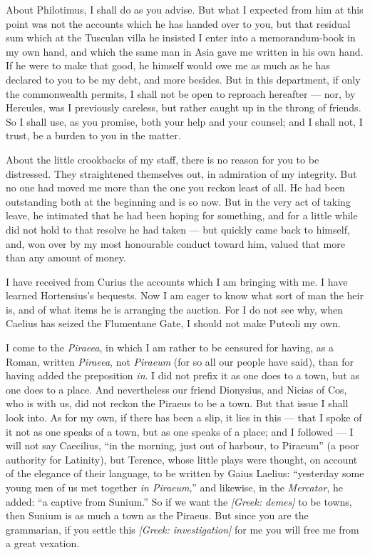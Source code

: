  About Philotimus, I shall do as you advise. But what I expected from him at this point was not the accounts which he has handed over to you, but that residual sum which at the Tusculan villa he insisted I enter into a memorandum-book in my own hand, and which the same man in Asia gave me written in his own hand. If he were to make that good, he himself would owe me as much as he has declared to you to be my debt, and more besides. But in this department, if only the commonwealth permits, I shall not be open to reproach hereafter --- nor, by Hercules, was I previously careless, but rather caught up in the throng of friends. So I shall use, as you promise, both your help and your counsel; and I shall not, I trust, be a burden to you in the matter.

 About the little crookbacks of my staff, there is no reason for you to be distressed. They straightened themselves out, in admiration of my integrity. But no one had moved me more than the one you reckon least of all. He had been outstanding both at the beginning and is so now. But in the very act of taking leave, he intimated that he had been hoping for something, and for a little while did not hold to that resolve he had taken --- but quickly came back to himself, and, won over by my most honourable conduct toward him, valued that more than any amount of money.

 I have received from Curius the accounts which I am bringing with me. I have learned Hortensius's bequests. Now I am eager to know what sort of man the heir is, and of what items he is arranging the auction. For I do not see why, when Caelius has seized the Flumentane Gate, I should not make Puteoli my own.

 I come to the \emph{Piraeea}, in which I am rather to be censured for having, as a Roman, written \emph{Piraeea}, not \emph{Piraeum} (for so all our people have said), than for having added the preposition \emph{in}. I did not prefix it as one does to a town, but as one does to a place. And nevertheless our friend Dionysius, and Nicias of Cos, who is with us, did not reckon the Piraeus to be a town. But that issue I shall look into. As for my own, if there has been a slip, it lies in this --- that I spoke of it not as one speaks of a town, but as one speaks of a place; and I followed --- I will not say Caecilius, ``in the morning, just out of harbour, to Piraeum'' (a poor authority for Latinity), but Terence, whose little plays were thought, on account of the elegance of their language, to be written by Gaius Laelius: ``yesterday some young men of us met together \emph{in Piraeum},'' and likewise, in the \emph{Mercator}, he added: ``a captive from Sunium.'' So if we want the \textit{[Greek: demes]} to be towns, then Sunium is as much a town as the Piraeus. But since you are the grammarian, if you settle this \textit{[Greek: investigation]} for me you will free me from a great vexation.


